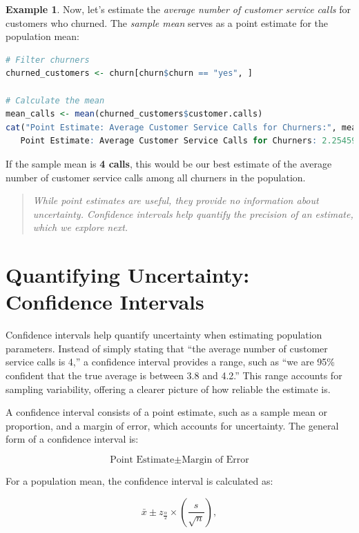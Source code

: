 \documentclass[
]{book}
\theoremstyle{definition}
\theoremstyle{definition}
\newtheorem{example}{Example}[chapter]
\theoremstyle{definition}
\theoremstyle{definition}
\theoremstyle{remark}
\begin{document}
\begin{example}
\protect\hypertarget{exm:ex-est-service-call}{}\label{exm:ex-est-service-call}Now, let's estimate the \emph{average number of customer service calls} for customers who churned. The \emph{sample mean} serves as a point estimate for the population mean:

\begin{lstlisting}[language=R]
# Filter churners
churned_customers <- churn[churn$churn == "yes", ]

# Calculate the mean
mean_calls <- mean(churned_customers$customer.calls)
cat("Point Estimate: Average Customer Service Calls for Churners:", mean_calls)
   Point Estimate: Average Customer Service Calls for Churners: 2.254597
\end{lstlisting}

If the sample mean is \textbf{4 calls}, this would be our best estimate of the average number of customer service calls among all churners in the population.
\end{example}

\begin{quote}
\emph{While point estimates are useful, they provide no information about uncertainty. Confidence intervals help quantify the precision of an estimate, which we explore next.}
\end{quote}

\section{Quantifying Uncertainty: Confidence Intervals}\label{statistics-confidence-interval}

Confidence intervals help quantify uncertainty when estimating population parameters. Instead of simply stating that ``the average number of customer service calls is 4,'' a confidence interval provides a range, such as ``we are 95\% confident that the true average is between 3.8 and 4.2.'' This range accounts for sampling variability, offering a clearer picture of how reliable the estimate is.

A confidence interval consists of a point estimate, such as a sample mean or proportion, and a margin of error, which accounts for uncertainty. The general form of a confidence interval is:

\[
\text{Point Estimate}  \pm \text{Margin of Error}
\]

For a population mean, the confidence interval is calculated as:

\[
\bar{x} \pm z_{\frac{\alpha}{2}} \times \left( \frac{s}{\sqrt{n}} \right),
\]
\end{document}
